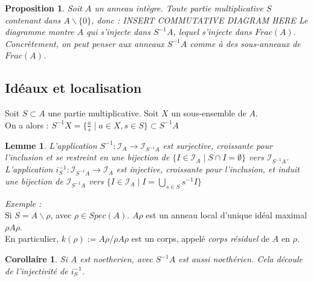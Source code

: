 \documentclass{article}           %
\newcommand\set[1]{\mathbb{#1}} 				%
\newcommand\cali[1]{\mathcal{#1}} 				%
\newcommand\cupp[2]{\underset{#1}{\overset{#2}{\bigcup}}} 	%
\newcommand\sma{S^{-1}A} 			%
\theoremstyle{break}
\theoremstyle{add}
\theoremstyle{break} %
\newtheorem{lemme}{Lemme}[section]
\newtheorem{corollaire}{Corollaire}[section]
\newtheorem{proposition}{Proposition}[section]
\theoremstyle{add}
\begin{document}
\begin{proposition}
Soit $A$ un anneau intègre. Toute partie multiplicative $S$ contenant dans $A \backslash \{0\}$, donc : \textit{INSERT COMMUTATIVE DIAGRAM HERE} 
Le diagramme montre $A$ qui s'injecte dans $S^{-1}A$, lequel s'injecte dans $Frac(A)$. \\

Concrètement, on peut penser aux anneaux $S^{-1}A$ comme à des sous-anneaux de $Frac(A)$. \\
\end{proposition}

\subsection{Idéaux et localisation}
Soit $S \subset A$ une partie multiplicative. Soit $X$ un sous-ensemble de $A$. \\
On a alors : $S^{-1}X = \{ \frac a s \;|\; a \in X, s \in S \} \subset \sma$

\begin{lemme}
L'application $S^{-1} : \cali{I}_A \longrightarrow \cali{I}_{\sma}$ est surjective, croissante pour l'inclusion et se restreint en une bijection de $\{I \in \cali{I}_A \;|\; S \cap I = \emptyset \}$ vers $\cali{I}_{\sma}$. \\ 

L'application $i_S^{-1} : \cali{I}_{\sma} \longrightarrow \cali{I}_A$ est injective, croissante pour l'inclusion, et induit une bijection de $\cali{I}_{\sma}$ vers $\{ I \in \cali{I}_{A} \;|\; I = \cupp{s \in S}{} s^{-1}I \}$ \\
\end{lemme}

\textit{Exemple :} \\
Si $S = A \backslash \rho$, avec $\rho \in Spec(A)$. $A\rho$ est un anneau local d'unique idéal maximal $\rho A\rho$. \\
En particulier, $k(\rho) := A\rho / \rho A \rho$ est un corps, appelé \textit{corps résiduel} de $A$ en $\rho$. \\

\begin{corollaire}
Si $A$ est noetherien, avec $\sma$ est aussi noethérien. Cela découle de l'injectivité de $i_S^{-1}$. \\
\end{corollaire}
\end{document}
